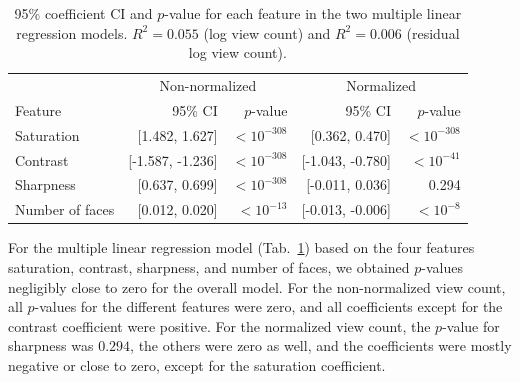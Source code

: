 \documentclass{article}
\begin{document}
\begin{table}[h]
\centering
\begin{tabular}{lrrrr}
\toprule
& \multicolumn{2}{c}{Non-normalized} & \multicolumn{2}{c}{Normalized} \\
\cmidrule(lr){2-3} \cmidrule(lr){4-5}
Feature & 95\% CI & $p$-value & 95\% CI & $p$-value \\
\midrule
Saturation & [1.482, 1.627] & $<10^{-308}$ & [0.362, 0.470] & $<10^{-308}$ \\

Contrast & [-1.587, -1.236] & $<10^{-308}$ & [-1.043, -0.780] & $<10^{-41}$ \\
Sharpness & [0.637, 0.699] & $<10^{-308}$ & [-0.011, 0.036] & 0.294 \\
Number of faces & [0.012, 0.020] & $<10^{-13}$ & [-0.013, -0.006] & $<10^{-8}$ \\
\bottomrule
\end{tabular}
\vspace{\baselineskip}
\caption{95\% coefficient CI and $p$-value for each feature in the two multiple linear regression models. $R^2 = 0.055$ (log view count) and $R^2 = 0.006$ (residual log view count).}
\label{tab:regression}
\end{table}

For the multiple linear regression model (Tab.~\ref{tab:regression}) based on the four features saturation, contrast, sharpness, and number of faces, we obtained $p$-values negligibly close to zero for the overall model. For the non-normalized view count, all $p$-values for the different features were zero, and all coefficients except for the contrast coefficient were positive. For the normalized view count, the $p$-value for sharpness was $0.294$, the others were zero as well, and the coefficients were mostly negative or close to zero, except for the saturation coefficient.
\end{document}
